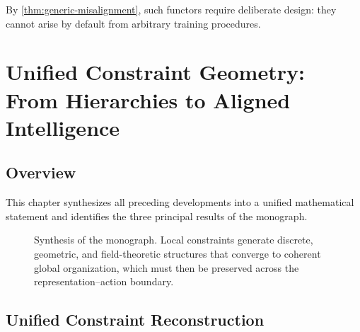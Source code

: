 \documentclass[12pt,a4paper,oneside]{book}
\numberwithin{equation}{chapter}
\theoremstyle{plain}
\theoremstyle{definition}
\theoremstyle{remark}
\begin{document}
By \cref{thm:generic-misalignment}, such functors require deliberate
design: they cannot arise by default from arbitrary training
procedures.


\chapter[Unified Constraint Geometry]{Unified Constraint Geometry: From Hierarchies to Aligned Intelligence}
\label{ch:synthesis}

\section{Overview}

This chapter synthesizes all preceding developments into a unified
mathematical statement and identifies the three principal results
of the monograph.

\begin{figure}[htbp]
\centering
{}
\caption{Synthesis of the monograph. Local constraints generate
discrete, geometric, and field-theoretic structures that converge to
coherent global organization, which must then be preserved across the
representation--action boundary.}
\label{fig:unified-constraint-geometry}
\end{figure}

\section{Unified Constraint Reconstruction}
\end{document}
